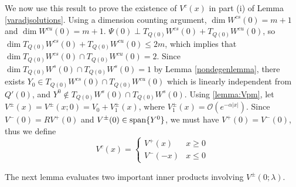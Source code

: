 \documentclass[10pt,reqno]{amsart}
\theoremstyle{plain}
\theoremstyle{definition}
\theoremstyle{remark}
\numberwithin{theorem}{section}
\numberwithin{equation}{section}
\begin{document}
We now use this result to prove the existence of $V^c(x)$ in part (i) of Lemma \ref{varadjsolutions}. Using a dimension counting argument, $\dim W^{cs}(0) = m + 1$ and $\dim W^{cu}(0) = m + 1$. $\Psi(0) \perp T_{Q(0)}W^{cs}(0) + T_{Q(0)}W^{cu}(0)$, so $\dim T_{Q(0)}W^{cs}(0) + T_{Q(0)}W^{cu}(0) \leq 2m$, which implies that $\dim T_{Q(0)}W^{cs}(0) \cap T_{Q(0)}W^{cu}(0) = 2$. Since $\dim T_{Q(0)}W^s(0) \cap T_{Q(0)}W^s(0) = 1$ by Lemma \ref{nondegenlemma}, there exists $Y_0 \in T_{Q(0)}W^{cs}(0) \cap T_{Q(0)}W^{cu}(0)$ which is linearly independent from $Q'(0)$, and $Y^0 \notin T_{Q(0)}W^s(0) \cap T_{Q(0)}W^s(0)$. Using \cref{lemma:Vpm}, let $V^\pm(x) = V^\pm(x; 0) = V_0 + V_1^\pm(x)$, where $V_1^\pm(x) = \mathcal{O}(e^{-\alpha |x|})$. Since $V^-(0) = R V^+(0)$ and $V^\pm(0) \in \mathop\mathrm{span}\nolimits \{Y^0 \}$, we must have $V^+(0) = V^-(0)$, thus we define 
\[
V^c(x) = \begin{cases}
V^+(x) & x \geq 0 \\
V^-(-x) & x \leq 0 
\end{cases}
\]

The next lemma evaluates two important inner products involving $V^\pm(0; \lambda)$.
\end{document}
